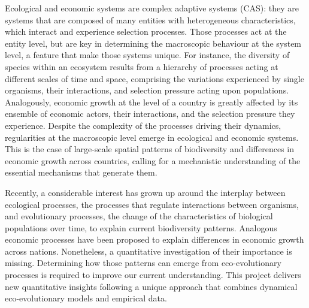 %
\label{sec:summary}

Ecological and economic systems are complex adaptive systems (CAS): they are systems that are composed of many entities with heterogeneous characteristics, which interact and experience selection processes. Those processes act at the entity level, but are key in determining the macroscopic behaviour at the system level, a feature that make those systems unique. For instance, the diversity of species within an ecosystem results from a hierarchy of processes acting at different scales of time and space, comprising the variations experienced by single organisms, their interactions, and selection pressure acting upon populations. Analogously, economic growth at the level of a country is greatly affected by its ensemble of economic actors, their interactions, and the selection pressure they experience. Despite the complexity of the processes driving their dynamics, regularities at the macroscopic level emerge in ecological and economic systems. This is the case of large-scale spatial patterns of biodiversity and differences in economic growth across countries, calling for a mechanistic understanding of the essential mechanisms that generate them.

Recently, a considerable interest has grown up around the interplay between ecological processes, the processes that regulate interactions between organisms, and evolutionary processes, the change of the characteristics of biological populations over time, to explain current biodiversity patterns. Analogous economic processes have been proposed to explain differences in economic growth across nations. Nonetheless, a quantitative investigation of their importance is missing. Determining how those patterns can emerge from eco-evolutionary processes is required to improve our current understanding. This project delivers new quantitative insights following a unique approach that combines dynamical eco-evolutionary models and empirical data.

